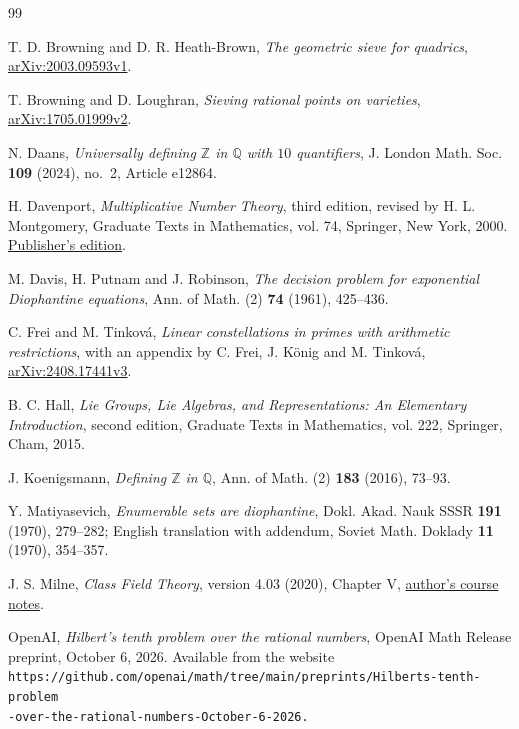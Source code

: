 \documentclass[11pt,reqno]{amsart}
\theoremstyle{definition}
\numberwithin{equation}{section}
\newcommand{\Q}{\mathbb Q}
\newcommand{\Z}{\mathbb Z}
\begin{document}
\begin{thebibliography}{99}

 T. D. Browning and D. R. Heath-Brown, \emph{The geometric sieve for quadrics}, \href{https://arxiv.org/abs/2003.09593v1}{arXiv:2003.09593v1}.
    
 T. Browning and D. Loughran, \emph{Sieving rational points on varieties}, \href{https://arxiv.org/abs/1705.01999v2}{arXiv:1705.01999v2}.
    
N. Daans,
\emph{Universally defining $\mathbb Z$ in $\mathbb Q$ with $10$ quantifiers},
J. London Math. Soc. \textbf{109} (2024), no.~2, Article e12864.
   

 H. Davenport, \emph{Multiplicative Number Theory}, third edition, revised by H. L. Montgomery, Graduate Texts in Mathematics, vol. 74, Springer, New York, 2000.
\href{https://link.springer.com/book/9780387950976}{Publisher's edition}.

 M. Davis, H. Putnam and J. Robinson,
\emph{The decision problem for exponential Diophantine equations},
Ann. of Math. (2) \textbf{74} (1961), 425--436.

 C. Frei and M. Tinkov\'a, \emph{Linear constellations in primes with arithmetic restrictions}, with an appendix by C. Frei, J. K\"onig and M. Tinkov\'a, \href{https://arxiv.org/abs/2408.17441v3}{arXiv:2408.17441v3}.
   

 B. C. Hall, \emph{Lie Groups, Lie Algebras, and Representations: An Elementary Introduction}, second edition, Graduate Texts in Mathematics, vol. 222, Springer, Cham, 2015.

 J. Koenigsmann,
\emph{Defining $\Z$ in $\Q$},
Ann. of Math. (2) \textbf{183} (2016), 73--93.

 Y. Matiyasevich, {\it Enumerable sets are diophantine},
 Dokl. Akad. Nauk SSSR {\bf 191} (1970), 279--282;
English translation with addendum, Soviet Math. Doklady {\bf 11} (1970), 354--357.

 J. S. Milne, \emph{Class Field Theory}, version 4.03 (2020), Chapter V, \href{https://www.jmilne.org/math/CourseNotes/CFT.pdf}{author's course notes}.
    
 OpenAI,
\emph{Hilbert's tenth problem over the rational numbers},
OpenAI Math Release preprint, October 6, 2026. Available from the website
{\tt https://github.com/openai/math/tree/main/preprints/Hilberts-tenth-problem
\\-over-the-rational-numbers-October-6-2026.}


\end{thebibliography}
\end{document}
